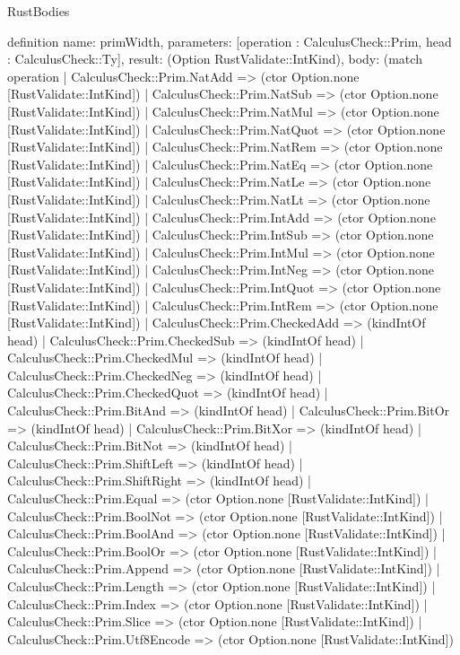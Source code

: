 \begin{lexlean}{RustBodies}
\begin{semanticmodule}
definition{
  name: primWidth,
  parameters: [operation : CalculusCheck::Prim, head : CalculusCheck::Ty],
  result: (Option RustValidate::IntKind),
  body: (match operation
    | CalculusCheck::Prim.NatAdd => (ctor Option.none [RustValidate::IntKind])
    | CalculusCheck::Prim.NatSub => (ctor Option.none [RustValidate::IntKind])
    | CalculusCheck::Prim.NatMul => (ctor Option.none [RustValidate::IntKind])
    | CalculusCheck::Prim.NatQuot => (ctor Option.none [RustValidate::IntKind])
    | CalculusCheck::Prim.NatRem => (ctor Option.none [RustValidate::IntKind])
    | CalculusCheck::Prim.NatEq => (ctor Option.none [RustValidate::IntKind])
    | CalculusCheck::Prim.NatLe => (ctor Option.none [RustValidate::IntKind])
    | CalculusCheck::Prim.NatLt => (ctor Option.none [RustValidate::IntKind])
    | CalculusCheck::Prim.IntAdd => (ctor Option.none [RustValidate::IntKind])
    | CalculusCheck::Prim.IntSub => (ctor Option.none [RustValidate::IntKind])
    | CalculusCheck::Prim.IntMul => (ctor Option.none [RustValidate::IntKind])
    | CalculusCheck::Prim.IntNeg => (ctor Option.none [RustValidate::IntKind])
    | CalculusCheck::Prim.IntQuot => (ctor Option.none [RustValidate::IntKind])
    | CalculusCheck::Prim.IntRem => (ctor Option.none [RustValidate::IntKind])
    | CalculusCheck::Prim.CheckedAdd => (kindIntOf head)
    | CalculusCheck::Prim.CheckedSub => (kindIntOf head)
    | CalculusCheck::Prim.CheckedMul => (kindIntOf head)
    | CalculusCheck::Prim.CheckedNeg => (kindIntOf head)
    | CalculusCheck::Prim.CheckedQuot => (kindIntOf head)
    | CalculusCheck::Prim.BitAnd => (kindIntOf head)
    | CalculusCheck::Prim.BitOr => (kindIntOf head)
    | CalculusCheck::Prim.BitXor => (kindIntOf head)
    | CalculusCheck::Prim.BitNot => (kindIntOf head)
    | CalculusCheck::Prim.ShiftLeft => (kindIntOf head)
    | CalculusCheck::Prim.ShiftRight => (kindIntOf head)
    | CalculusCheck::Prim.Equal => (ctor Option.none [RustValidate::IntKind])
    | CalculusCheck::Prim.BoolNot => (ctor Option.none [RustValidate::IntKind])
    | CalculusCheck::Prim.BoolAnd => (ctor Option.none [RustValidate::IntKind])
    | CalculusCheck::Prim.BoolOr => (ctor Option.none [RustValidate::IntKind])
    | CalculusCheck::Prim.Append => (ctor Option.none [RustValidate::IntKind])
    | CalculusCheck::Prim.Length => (ctor Option.none [RustValidate::IntKind])
    | CalculusCheck::Prim.Index => (ctor Option.none [RustValidate::IntKind])
    | CalculusCheck::Prim.Slice => (ctor Option.none [RustValidate::IntKind])
    | CalculusCheck::Prim.Utf8Encode => (ctor Option.none [RustValidate::IntKind])
}
\end{semanticmodule}
\end{lexlean}
